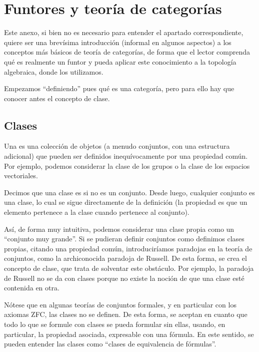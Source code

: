 \chapter{Funtores y teoría de categorías}
\label{funt}

Este anexo, si bien no es necesario para entender el apartado correspondiente, quiere ser una brevísima introducción (informal en algunos aspectos) a los conceptos más básicos de teoría de categorías, de forma que el lector comprenda qué es realmente un funtor y pueda aplicar este conocimiento a la topología algebraica, donde los utilizamos. 

Empezamos ``definiendo'' pues qué es una categoría, pero para ello hay que conocer antes el concepto de clase.

\section{Clases}

\begin{defi}[Clase]
Una  es una colección de objetos (a menudo conjuntos, con una estructura adicional) que pueden ser definidos inequívocamente por una propiedad común. Por ejemplo, podemos considerar la clase de los grupos o la clase de los espacios vectoriales.
\end{defi}

\begin{obs}
Decimos que una clase es  si no es un conjunto. Desde luego, cualquier conjunto es una clase, lo cual se sigue directamente de la definición (la propiedad es que un elemento pertenece a la clase cuando pertenece al conjunto).

Así, de forma muy intuitiva, podemos considerar una clase propia como un ``conjunto muy grande''. Si se pudieran definir conjuntos como definimos clases propias, citando una propiedad común, introduciríamos paradojas en la teoría de conjuntos, como la archiconocida paradoja de Russell. De esta forma, se crea el concepto de clase, que trata de solventar este obstáculo. Por ejemplo, la paradoja de Russell no se da con clases porque no existe la noción de que una clase esté contenida en otra.

Nótese que en algunas teorías de conjuntos formales, y en particular con los axiomas ZFC, las clases no se definen. De esta forma, se aceptan en cuanto que todo lo que se formule con clases se pueda formular sin ellas, usando, en particular, la propiedad asociada, expresable con una fórmula. En este sentido, se pueden entender las clases como ``clases de equivalencia de fórmulas''.
\end{obs}

